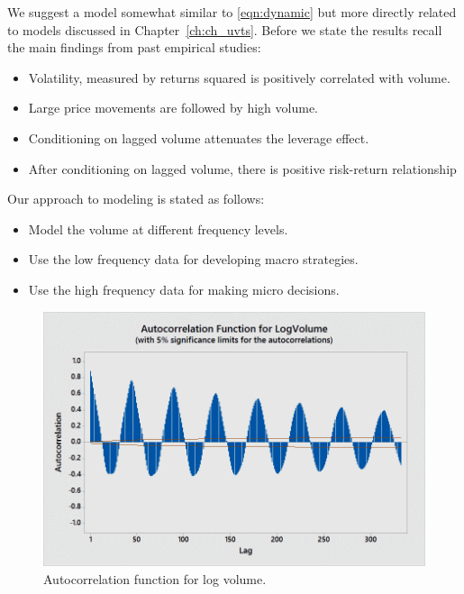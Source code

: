 We suggest a model somewhat similar to \eqref{eqn:dynamic} but more directly related to models discussed in Chapter~\ref{ch:ch_uvts}. Before we state the results recall the main findings from past empirical studies:
	\begin{itemize}
	\item Volatility, measured by returns squared is positively correlated with volume.
	\item Large price movements are followed by high volume.
	\item Conditioning on lagged volume attenuates the leverage effect.
	\item After conditioning on lagged volume, there is positive risk-return relationship
	\end{itemize}
Our approach to modeling is stated as follows:
	\begin{itemize}
	\item Model the volume at different frequency levels.
	\item Use the low frequency data for developing macro strategies.
	\item Use the high frequency data for making micro decisions.
	\end{itemize}

        \begin{figure}[!ht]
        \centering
        \includegraphics[width=\textwidth]{chapters/chapter_stat_ts/figures/logvol.png}
        \caption{Autocorrelation function for log volume. \label{fig:logvolumeauto}}
        \end{figure}
        
